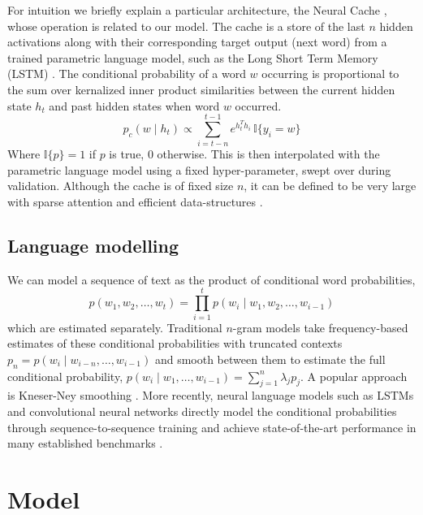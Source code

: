 \documentclass{article} \usepackage{hyperref}
\begin{document}
For intuition we briefly explain a particular architecture, the Neural Cache \citep{grave2016improving}, whose operation is related to our model. The cache is a store of the last $n$ hidden activations along with their corresponding target output (next word) from a trained parametric language model, such as the Long Short Term Memory (LSTM) \citep{hochreiter1997long}. The conditional probability of a word $w$ occurring is proportional to the sum over kernalized inner product similarities between the current hidden state $h_t$ and past hidden states when word $w$ occurred.
\begin{equation}
\label{eq:cache}
p_c(w \mid h_t) \propto \sum_{i = t - n}^{t - 1} e^{h_t^T h_i} \, \mathbb{I}\{y_i = w\}
\end{equation}
Where $\mathbb{I}\{p\} = 1$ if $p$ is true, $0$ otherwise. This is then interpolated with the parametric language model using a fixed hyper-parameter, swept over during validation. Although the cache is of fixed size $n$, it can be defined to be very large with sparse attention and efficient data-structures \cite{rae2016scaling, kaiser2017learning, grave2017unbounded}.

\subsection{Language modelling}
We can model a sequence of text as the product of conditional word probabilities,
\[ p(w_{1}, w_2, \ldots, w_t) = \prod_{i = 1}^t p(w_i \mid w_1, w_2, \ldots , w_{i-1}) \]
which are estimated separately. Traditional $n$-gram models take frequency-based estimates of these conditional probabilities with truncated contexts $p_n = p(w_i \mid w_{i-n}, \ldots, w_{i-1})$ and smooth between them to estimate the full conditional probability, $p(w_i \mid w_1, \ldots, w_{i-1}) = \sum_{j=1}^n \lambda_j p_j$. A popular approach is Kneser-Ney smoothing \citep{kneser1995improved}. More recently, neural language models such as LSTMs and convolutional neural networks directly model the conditional probabilities through sequence-to-sequence training and achieve state-of-the-art performance in many established benchmarks \citep{collobert2008unified, sundermeyer2012lstm, kalchbrenner2014convolutional, jozefowicz2016exploring, dauphin2016language, melis2017state}.

\section{Model}
\label{sec:model}
\end{document}
